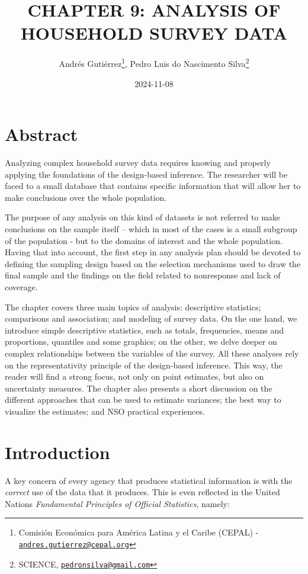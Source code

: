 \documentclass[
  12pt,
]{book}
\title{CHAPTER 9: ANALYSIS OF HOUSEHOLD SURVEY DATA}
\author{Andrés Gutiérrez\footnote{Comisión Económica para América Latina y el Caribe (CEPAL) - \href{mailto:andres.gutierrez@cepal.org}{\nolinkurl{andres.gutierrez@cepal.org}}}, Pedro Luis do Nascimento Silva\footnote{SCIENCE, \href{mailto:pedronsilva@gmail.com}{\nolinkurl{pedronsilva@gmail.com}}}}
\date{2024-11-08}
\begin{document}
\maketitle

{
\hypersetup{linkcolor=}
\setcounter{tocdepth}{0}
\tableofcontents
}
\listoffigures
\listoftables
\hypertarget{abstract}{%
\chapter*{Abstract}\label{abstract}}

Analyzing complex household survey data requires knowing and properly applying the foundations of the design-based inference. The researcher will be faced to a small database that contains specific information that will allow her to make conclusions over the whole population.

The purpose of any analysis on this kind of datasets is not referred to make conclusions on the sample itself -- which in most of the cases is a small subgroup of the population - but to the domains of interest and the whole population. Having that into account, the first step in any analysis plan should be devoted to defining the sampling design based on the selection mechanisms used to draw the final sample and the findings on the field related to nonresponse and lack of coverage.

The chapter covers three main topics of analysis: descriptive statistics; comparisons and association; and modeling of survey data. On the one hand, we introduce simple descriptive statistics, such as totals, frequencies, means and proportions, quantiles and some graphics; on the other, we delve deeper on complex relationships between the variables of the survey. All these analyses rely on the representativity principle of the design-based inference. This way, the reader will find a strong focus, not only on point estimates, but also on uncertainty measures. The chapter also presents a short discussion on the different approaches that can be used to estimate variances; the best way to visualize the estimates; and NSO practical experiences.

\hypertarget{introduction}{%
\chapter*{Introduction}\label{introduction}}

A key concern of every agency that produces statistical information is with the \emph{correct} use of the data that it produces. This is even reflected in the United Nations \emph{Fundamental Principles of Official Statistics}, namely:
\end{document}
